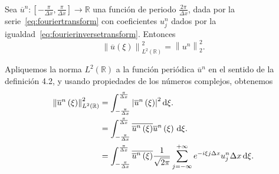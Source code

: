 \begin{frame}
    \frametitle{\secname}

    \begin{theorem}\normalfont
        Sea
        \begin{math}
            \overline{u}^{n}\colon
            \left[
                -\frac{\pi}{\Delta x},
                \frac{\pi}{\Delta x}
                \right]\to
            \mathbb{R}
        \end{math}
        una función de periodo $\frac{2\pi}{\Delta x}$, dada por la
        serie~\eqref{eq:fouriertransform} con coeficientes $u^{n}_{j}$
        dados por la igualdad~\eqref{eq:fourierinversetransform}.
        Entonces
        \begin{equation}\label{eq:parsevalidentity}
            {\left\|\overline{u}\left(\xi\right)\right\|}^{2}_{L^{2}\left(\mathbb{R}\right)}=
            {\left\|u^{n}\right\|}^{2}_{2}.
        \end{equation}
    \end{theorem}

    \begin{proofs}
        Apliquemos la norma $L^{2}\left(\mathbb{R}\right)$ a la función
        periódica $\overline{u}^{n}$ en el sentido de la definición 4.2, y
        usando propiedades de los números complejos, obtenemos
        \begin{align*}
            {\left\|
                \overline{u}^{n}
                \left(\xi\right)
            \right\|}^{2}_{L^{2}\left(\mathbb{R}\right)} & =
            \int_{-\frac{\pi}{\Delta x}}^{\frac{\pi}{\Delta x}}
            {\left|
                \overline{u}^{n}
                \left(\xi\right)
                \right|}^{2}
            \dl\xi.                                          \\
                                                         & =
            \int_{-\frac{\pi}{\Delta x}}^{\frac{\pi}{\Delta x}}
            \overline{\overline{u}^{n}\left(\xi\right)}
            \overline{u}^{n}
            \left(\xi\right)
            \dl\xi.                                          \\
                                                         & =
            \int_{-\frac{\pi}{\Delta x}}^{\frac{\pi}{\Delta x}}
            \overline{\overline{u}^{n}\left(\xi\right)}
            \frac{1}{\sqrt{2\pi}}
            \sum_{j=-\infty}^{+\infty}
            e^{-i\xi j\Delta x}
            u^{n}_{j}
            \Delta x
            \dl\xi.
        \end{align*}
    \end{proofs}
\end{frame}


